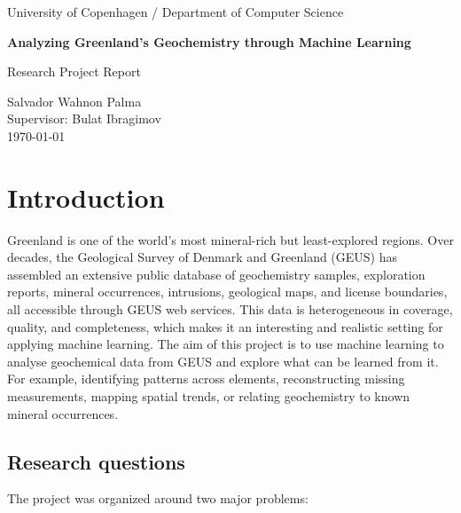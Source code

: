 \documentclass[
    a4paper,
    11pt,
    oneside,
    numbers=noendperiod,
    abstract=true
]{scrartcl}
\begin{document}
\begin{titlepage}
    \centering
    {\Large University of Copenhagen / Department of Computer Science\par}
    \vspace{2cm}

    {\Huge\bfseries Analyzing Greenland's Geochemistry through Machine Learning\par}
    \vspace{1.5cm}

    {\Large Research Project Report\par}
    \vfill

    {\large
    Salvador Wahnon Palma\\
    Supervisor: Bulat Ibragimov\\
    \today
    \par}
\end{titlepage}

\begin{abstract}
TO DO
\end{abstract}

\tableofcontents

\section{Introduction}
\label{ch:introduction}

Greenland is one of the world's most mineral-rich but least-explored regions. Over decades, the Geological Survey of Denmark and Greenland (GEUS) \parencite{greenland_portal}  has assembled an extensive public database of geochemistry samples, exploration reports, mineral occurrences, intrusions, geological maps, and license boundaries, all accessible through GEUS web services. This data is heterogeneous in coverage, quality, and completeness, which makes it an interesting and realistic setting for applying machine learning.
The aim of this project is to use machine learning to analyse geochemical data from GEUS and explore what can be learned from it. For example, identifying patterns across elements, reconstructing missing measurements, mapping spatial trends, or relating geochemistry to known mineral occurrences. 


\subsection{Research questions}

The project was organized around two major problems:
\end{document}

